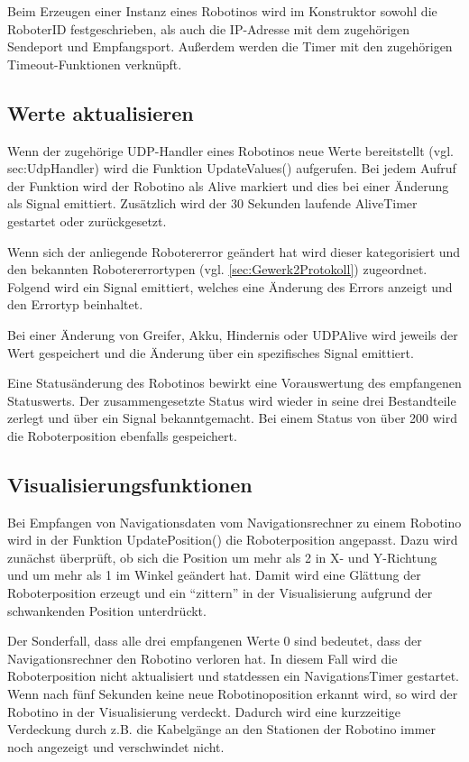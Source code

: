 Beim Erzeugen einer Instanz eines Robotinos wird im Konstruktor sowohl die RoboterID festgeschrieben, als auch die IP-Adresse mit dem zugehörigen Sendeport und Empfangsport. Außerdem werden die Timer mit den zugehörigen Timeout-Funktionen verknüpft.

\subsection{Werte aktualisieren}

Wenn der zugehörige UDP-Handler eines Robotinos neue Werte bereitstellt (vgl. sec:UdpHandler) wird die Funktion UpdateValues() aufgerufen. Bei jedem Aufruf der Funktion wird der Robotino als Alive markiert und dies bei einer Änderung als Signal emittiert. Zusätzlich wird der 30 Sekunden laufende AliveTimer gestartet oder zurückgesetzt. 

Wenn sich der anliegende Robotererror geändert hat wird dieser kategorisiert und den bekannten Robotererrortypen (vgl. \ref{sec:Gewerk2Protokoll}) zugeordnet. Folgend wird ein Signal emittiert, welches eine Änderung des Errors anzeigt und den Errortyp beinhaltet.

Bei einer Änderung von Greifer, Akku, Hindernis oder UDPAlive wird jeweils der Wert gespeichert und die Änderung über ein spezifisches Signal emittiert. 

Eine Statusänderung des Robotinos bewirkt eine Vorauswertung des empfangenen Statuswerts. Der zusammengesetzte Status wird wieder in seine drei Bestandteile zerlegt und über ein Signal bekanntgemacht. Bei einem Status von über 200 wird die Roboterposition ebenfalls gespeichert. 

\subsection{Visualisierungsfunktionen}

Bei Empfangen von Navigationsdaten vom Navigationsrechner zu einem Robotino wird in der Funktion UpdatePosition() die Roboterposition angepasst. Dazu wird zunächst überprüft, ob sich die Position um mehr als 2 in X- und Y-Richtung und um mehr als 1 im Winkel geändert hat. Damit wird eine Glättung der Roboterposition erzeugt und ein "`zittern"' in der Visualisierung aufgrund der schwankenden Position unterdrückt. 

Der Sonderfall, dass alle drei empfangenen Werte 0 sind bedeutet, dass der Navigationsrechner den Robotino verloren hat. In diesem Fall wird die Roboterposition nicht aktualisiert und statdessen ein NavigationsTimer gestartet. Wenn nach fünf Sekunden keine neue Robotinoposition erkannt wird, so wird der Robotino in der Visualisierung verdeckt. Dadurch wird eine kurzzeitige Verdeckung durch z.B. die Kabelgänge an den Stationen der Robotino immer noch angezeigt und verschwindet nicht.

